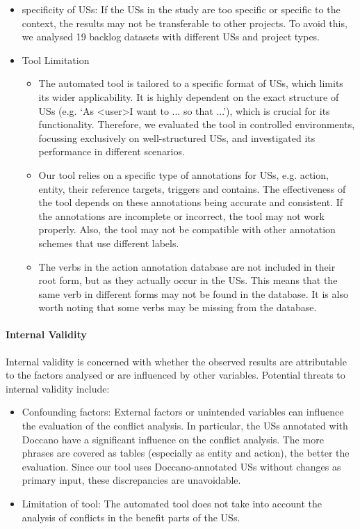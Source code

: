 \begin{itemize}
	\item specificity of USs: If the USs in the study are too specific or specific to the context, the results may not be transferable to other projects. To avoid this, we analysed 19 backlog datasets with different USs and project types.
	
	\item Tool Limitation
	\begin{itemize}
		 
	
	 \item The automated tool is tailored to a specific format of USs, which limits its wider applicability. It is highly dependent on the exact structure of USs (e.g. ‘As \textless user\textgreater I want to ... so that ...’), which is crucial for its functionality. Therefore, we evaluated the tool in controlled environments, focussing exclusively on well-structured USs, and investigated its performance in different scenarios.
	
	\item Our tool relies on a specific type of annotations for USs, e.g. action, entity, their reference targets, triggers and contains. The effectiveness of the tool depends on these annotations being accurate and consistent. If the annotations are incomplete or incorrect, the tool may not work properly. Also, the tool may not be compatible with other annotation schemes that use different labels.
	
	\item The verbs in the action annotation database are not included in their root form, but as they actually occur in the USs. This means that the same verb in different forms may not be found in the database. It is also worth noting that some verbs may be missing from the database.
\end{itemize}
\end{itemize}
\paragraph{Internal Validity}Internal validity is concerned with whether the observed results are attributable to the factors analysed or are influenced by other variables. Potential threats to internal validity include:
\begin{itemize}
	\item Confounding factors: External factors or unintended variables can influence the evaluation of the conflict analysis. In particular, the USs annotated with Doccano have a significant influence on the conflict analysis. The more phrases are covered as tables (especially as entity and action), the better the evaluation. Since our tool uses Doccano-annotated USs without changes as primary input, these discrepancies are unavoidable.
	
	\item Limitation of tool: The automated tool does not take into account the analysis of conflicts in the benefit parts of the USs.
\end{itemize}
